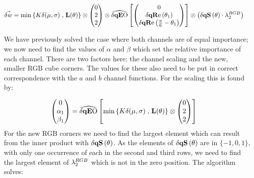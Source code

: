 \begin{align*}
\dW    &=  \min\left\{K \delta(\mu,\sigma) \right. ,  \left. \mathbf{L}(\theta) \right\} 
 \otimes 
        \begin{pmatrix}  0   \\   2   \\  2    \\ \end{pmatrix} 
  \otimes
        \dqEO\left[   \begin{pmatrix}  0   \\ \dqRe[ \thetaA ]  \\ \dqRe[ \Pii{6} -\thetaA]   \\ \end{pmatrix}  \right]
 \otimes
        \left( \dqs[\theta]  \cdot \discard^{RGB}_2 \right) 
\end{align*}

We have previously solved the case where both channels are of equal importance; we now need to find the values of $\alpha$ and $\beta$ which set the relative importance of each channel. There are two factors here: the channel scaling and the new, smaller RGB cube corners. The values for these also need to be put in correct correspondence with the $a$ and $b$ channel functions. For the scaling this is found by:

\begin{align*}
 \begin{pmatrix}  0   \\   \alpha_1   \\  \beta_1   \\ \end{pmatrix}     &=  
\dqEO\left[  \min\left\{K \delta(\mu,\sigma) \right. ,  \left. \mathbf{L}(\theta) \right\} 
 \otimes 
        \begin{pmatrix}  0   \\   2   \\  2    \\ \end{pmatrix} \right]
\end{align*}
For the new RGB corners we need to find the largest element which can result from the inner product with $\dqs[\theta]$. As the elements of $\dqs[\theta]$ are in $\{-1,0,1\}$, with only one occurrence of each in the second and third rows, we need to find the largest element of $\lambda^{RGB}_2$ which is not in the zero position. The algorithm solves:


